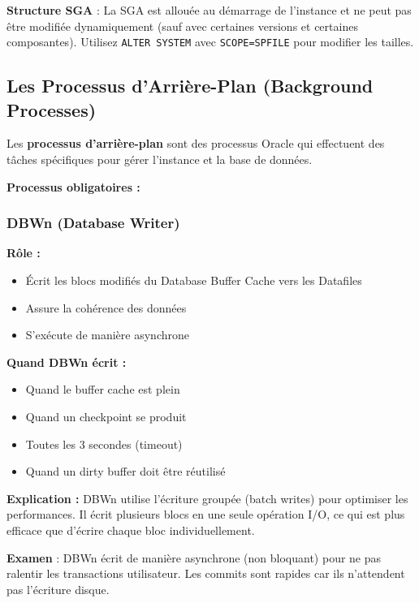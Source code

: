 \documentclass[11pt,a4paper]{article}
\begin{document}
\begin{importantbox}
\textbf{Structure SGA} : La SGA est allouée au démarrage de l'instance et ne peut pas être modifiée dynamiquement (sauf avec certaines versions et certaines composantes). Utilisez \texttt{ALTER SYSTEM} avec \texttt{SCOPE=SPFILE} pour modifier les tailles.
\end{importantbox}

\subsection{Les Processus d'Arrière-Plan (Background Processes)}

\begin{definitionbox}
Les \textbf{processus d'arrière-plan} sont des processus Oracle qui effectuent des tâches spécifiques pour gérer l'instance et la base de données.
\end{definitionbox}

\textbf{Processus obligatoires :}

\subsubsection{DBWn (Database Writer)}

\textbf{Rôle :}
\begin{itemize}
    \item Écrit les blocs modifiés du Database Buffer Cache vers les Datafiles
    \item Assure la cohérence des données
    \item S'exécute de manière asynchrone
\end{itemize}

\textbf{Quand DBWn écrit :}
\begin{itemize}
    \item Quand le buffer cache est plein
    \item Quand un checkpoint se produit
    \item Toutes les 3 secondes (timeout)
    \item Quand un dirty buffer doit être réutilisé
\end{itemize}

\textbf{Explication :} DBWn utilise l'écriture groupée (batch writes) pour optimiser les performances. Il écrit plusieurs blocs en une seule opération I/O, ce qui est plus efficace que d'écrire chaque bloc individuellement.

\begin{tipbox}
\textbf{Examen} : DBWn écrit de manière asynchrone (non bloquant) pour ne pas ralentir les transactions utilisateur. Les commits sont rapides car ils n'attendent pas l'écriture disque.
\end{tipbox}
\end{document}
